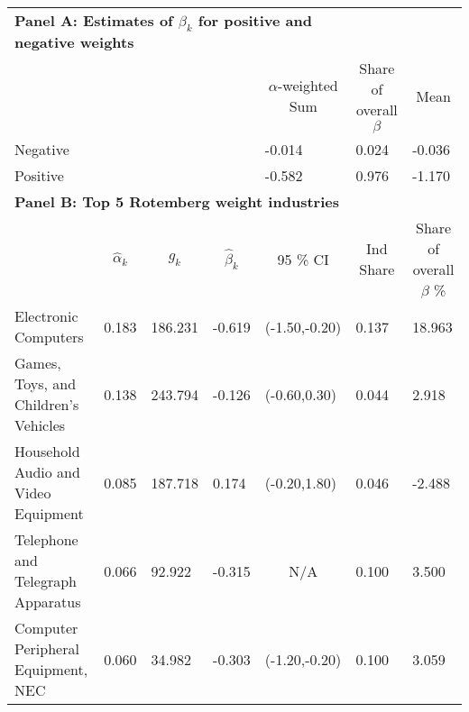 \begin{table}[]
\centeringe
\begin{tabular}{lllllll}
\multicolumn{5}{l}{\textbf{Panel A: Estimates of $\beta_{k}$ for positive and negative weights} }\\
 &  &  &  & \multicolumn{1}{c}{$\alpha$-weighted Sum} & \multicolumn{1}{c}{Share of overall $\beta$} & \multicolumn{1}{c}{Mean} \\ \cline{5-7} 
Negative &  &  &  & -0.014 & 0.024  & -0.036 \\
Positive &  &  &  & -0.582 & 0.976 & -1.170 \\
\multicolumn{7}{l}{\textbf{Panel B: Top 5 Rotemberg weight industries}} \\
 & \multicolumn{1}{c}{$\hat{\alpha}_{k}$} & \multicolumn{1}{c}{$ g_{k}$} & \multicolumn{1}{c}{$\hat{\beta}_{k}$} & \multicolumn{1}{c}{95 \% CI} & \multicolumn{1}{c}{Ind Share} & \multicolumn{1}{c}{Share of overall $\beta$ \%} \\ \cline{2-7} 
Electronic Computers & 0.183 & 186.231 & -0.619 & (-1.50,-0.20)  & 0.137 & 18.963\\ 
Games, Toys, and Children's Vehicles & 0.138 & 243.794 & -0.126 & (-0.60,0.30)  & 0.044 & 2.918\\ 
Household Audio and Video Equipment & 0.085 & 187.718 & 0.174 & (-0.20,1.80)  & 0.046 & -2.488\\ 
Telephone and Telegraph Apparatus & 0.066 & 92.922 & -0.315 & \multicolumn{1}{c}{N/A}  & 0.100 & 3.500 \\ 
Computer Peripheral Equipment, NEC & 0.060 & 34.982 & -0.303 & (-1.20,-0.20)  & 0.100 & 3.059\\ 
\end{tabular}
\end{table}
